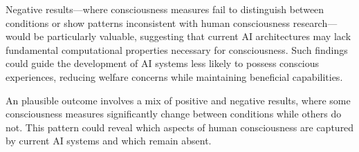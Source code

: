 \documentclass[11pt,a4paper]{article}
\begin{document}
Negative results—where consciousness measures fail to distinguish between conditions or show patterns inconsistent with human consciousness research—would be particularly valuable, suggesting that current AI architectures may lack fundamental computational properties necessary for consciousness. Such findings could guide the development of AI systems less likely to possess conscious experiences, reducing welfare concerns while maintaining beneficial capabilities.

An plausible outcome involves a mix of positive and negative results, where some consciousness measures significantly change between conditions while others do not. This pattern could reveal which aspects of human consciousness are captured by current AI systems and which remain absent.
\end{document}
